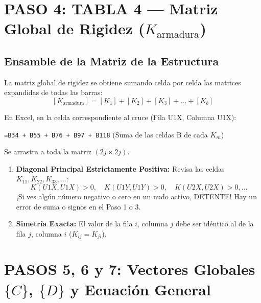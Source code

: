 \documentclass[10pt,a4paper]{article}
\begin{document}
\newpage

\section{PASO 4: TABLA 4 — Matriz Global de Rigidez (\texorpdfstring{$K_{\text{armadura}}$}{Karmadura})}

\subsection{Ensamble de la Matriz de la Estructura}
La matriz global de rigidez se obtiene sumando celda por celda las matrices expandidas de todas las barras:
\[
[K_{\text{armadura}}] = [K_1] + [K_2] + [K_3] + \dots + [K_b]
\]

En Excel, en la celda correspondiente al cruce (Fila U1X, Columna U1X):
\begin{center}
\texttt{=B34 + B55 + B76 + B97 + B118} \quad (Suma de las celdas B de cada $K_m$)
\end{center}
Se arrastra a toda la matriz $(2j \times 2j)$.

\begin{warningbox}
\begin{enumerate}
    \item \textbf{Diagonal Principal Estrictamente Positiva:}
    Revisa las celdas $K_{11}, K_{22}, K_{33}, \dots$:
    \[
    K(U1X, U1X) > 0, \quad K(U1Y, U1Y) > 0, \quad K(U2X, U2X) > 0, \dots
    \]
    ¡Si ves algún número negativo o cero en un nudo activo, DETENTE! Hay un error de suma o signos en el Paso 1 o 3.
    \item \textbf{Simetría Exacta:}
    El valor de la fila $i$, columna $j$ debe ser idéntico al de la fila $j$, columna $i$ ($K_{ij} = K_{ji}$).
\end{enumerate}
\end{warningbox}

\section{PASOS 5, 6 y 7: Vectores Globales \texorpdfstring{$\{C\}$}{C}, \texorpdfstring{$\{D\}$}{D} y Ecuación General}
\end{document}

